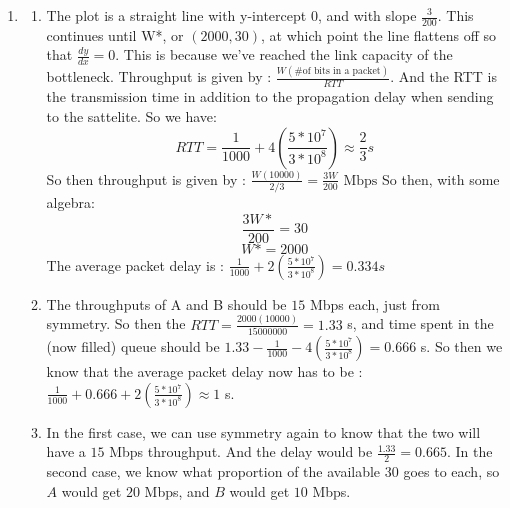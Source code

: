 \begin{enumerate}
  \item 
    \begin{enumerate}
      \item The plot is a straight line with y-intercept $0$, and with slope $\frac{3}{200}$. This continues until W*, or $(2000,30)$, at which point the line flattens off so that $\frac{dy}{dx} = 0$. This is because we've reached the link capacity of the bottleneck.
        Throughput is given by : $\frac{W(\text{\# of bits in a packet})}{RTT}$. And the RTT is the transmission time in addition to the propagation delay when sending to the sattelite. So we have:
        $$RTT = \frac{1}{1000} + 4(\frac{5*10^7}{3*10^8}) \approx \frac{2}{3}s$$
        So then throughput is given by : $\frac{W(10000)}{2/3} = \frac{3W}{200} \text{ Mbps}$
        So then, with some algebra:
        $$\frac{3W*}{200} = 30$$
        $$W* = 2000$$
        The average packet delay is : $\frac{1}{1000} + 2(\frac{5*10^7}{3*10^8}) = 0.334s$

      \item 
        The throughputs of A and B should be $15$ Mbps each, just from symmetry. So then the $RTT = \frac{2000(10000)}{15000000} = 1.33$ s, and time spent in the (now filled) queue should be $1.33 - \frac{1}{1000} - 4(\frac{5*10^7}{3*10^8}) = 0.666$ s. So then we know that the average packet delay now has to be : $\frac{1}{1000} + 0.666 + 2(\frac{5*10^7}{3*10^8}) \approx 1$ s.

      \item
        In the first case, we can use symmetry again to know that the two will have a $15$ Mbps throughput. And the delay would be $\frac{1.33}{2} = 0.665$. In the second case, we know what proportion of the available $30$ goes to each, so $A$ would get $20$ Mbps, and $B$ would get $10$ Mbps.
        

\end{enumerate}
\end{enumerate}
